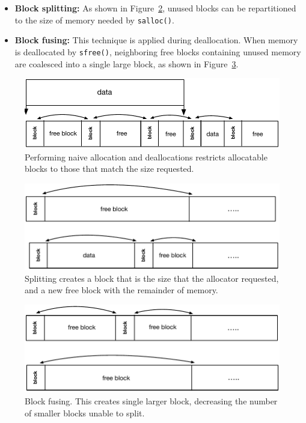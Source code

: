 \begin{itemize}
\item \textbf{Block splitting:} As shown in Figure~\ref{fig:split}, unused blocks can be repartitioned to the size of memory needed by \texttt{salloc()}.
\item \textbf{Block fusing:}
This technique is applied during deallocation. When memory is deallocated by \texttt{sfree()}, neighboring free blocks containing unused memory are coalesced into a single large block, as shown in Figure~\ref{fig:fuse}.
\end{itemize} 

\begin{figure}[!htb]
\centering
\includegraphics[scale=.55]{figs/fragmentation.pdf}
\caption{Performing naive allocation and deallocations restricts allocatable blocks to those that match the size requested.}
\label{fig:fragmentation}
\end{figure}

\begin{figure}[!htb]
\centering
\includegraphics[scale=.55]{figs/split.pdf}
\caption{Splitting creates a block that is the size that the allocator requested, and a new free block with the remainder of memory.}
\label{fig:split}
\end{figure}


\begin{figure}[!htb]
\centering
\includegraphics[scale=.55]{figs/fuse.pdf}
\caption{Block fusing. This creates single larger block, decreasing the number of smaller blocks unable to split.}
\label{fig:fuse}
\end{figure}
 
%
%
